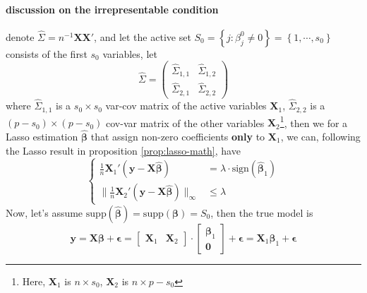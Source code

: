\documentclass[twoside]{article}
\begin{document}
\paragraph*{discussion on the irrepresentable condition} denote $\hat{\Sigma}=n^{-1}\mathbf{XX}'$, and let the active set $S_0=\left\{ j:\beta^0_j\neq 0 \right\}=\left\{ 1,\cdots, s_0 \right\}$ consists of the first $s_0$ variables, let 
$$ \hat{\Sigma} = \left( \begin{matrix}
    \hat{\Sigma}_{1,1} & \hat{\Sigma}_{1,2} \\
    \hat{\Sigma}_{2,1} & \hat{\Sigma}_{2,2}
\end{matrix} \right) $$
where $\hat{\Sigma}_{1,1}$ is a $s_0\times s_0$ var-cov matrix of the active variables $\mathbf{X}_1$, $\hat{\Sigma}_{2,2}$ is a $(p-s_0)\times (p-s_0)$ cov-var matrix of the other variables $\mathbf{X}_2$\footnote{Here, $\mathbf{X}_1$ is $n\times s_0$, $\mathbf{X}_2$ is $n\times p-s_0$}, then we for a Lasso estimation $\hat{\boldsymbol{\beta}}$ that assign non-zero coefficients \textbf{only} to $\mathbf{X}_1$, we can, following the Lasso result in proposition \ref{prop:lasso-math}, have
$$
\begin{cases}
    \frac{1}{n}\mathbf{X}_1'\left(\mathbf{y}-\mathbf{X}\hat{\boldsymbol{\beta}}\right) &= \lambda \cdot \mathrm{sign}(\hat{\boldsymbol{\beta}}_1)\\
    \lVert \frac{1}{n}\mathbf{X}_2'\left(\mathbf{y}-\mathbf{X}\hat{\boldsymbol{\beta}}\right) \rVert _{\infty} &\leq \lambda
\end{cases}
$$
Now, let's assume $ \mathrm{supp}(\hat{\boldsymbol{\beta}}) = \mathrm{supp}(\boldsymbol{\beta}) = S_0 $, then the true model is
$$
\mathbf{y} = \mathbf{X}\boldsymbol{\beta} + \boldsymbol{\epsilon} = \begin{bmatrix}
    \mathbf{X}_1 &\mathbf{X}_2
\end{bmatrix}\cdot \begin{bmatrix}
    \boldsymbol{\beta}_1 \\ \mathbf{0}
\end{bmatrix} + \boldsymbol{\epsilon} = \mathbf{X}_1\boldsymbol{\beta}_1+\boldsymbol{\epsilon}
$$
\end{document}
